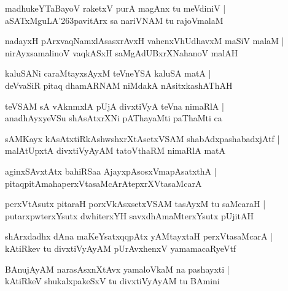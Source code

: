 \documentclass[twoside,12pt,openright]{book}
\def\S{\char'263}
\newcounter{shloka}[chapter]
\begin{document}
\begin{shloka}%
madhukeYTaBayoV raketxV purA magAnx tu meVdiniV |\\
aSATxMguLA\S pavitArx sa nariVNAM tu rajoVmalaM 
\end{shloka}

\begin{shloka}%
nadayxH pArxvaqNamxlAsasxrAvxH vahenxVhUdhavxM maSiV malaM |\\
nirAyxsamalinoV vaqkASxH saMgAdUBxrXNahanoV malAH 
\end{shloka}

\begin{shloka}%
kaluSANi caraMtayxsAyxM teVneYSA kaluSA matA |\\
deVvaSiR pitaq dhamARNAM niMdakA nAsitxkashAThAH 
\end{shloka}

\begin{shloka}%
teVSAM sA vAknmxlA pUjA divxtiVyA teVna nimaRlA |\\
anadhAyxyeVSu shAsAtxrXNi pAThayaMti paThaMti ca 
\end{shloka}

\begin{shloka}%
sAMKayx kAsAtxtiRkAshwshxrXtAsetxVSAM shabAdxpashabadxjAtf |\\
malAtUpxtA divxtiVyAyAM tatoVthaRM nimaRlA matA 
\end{shloka}

\begin{shloka}%
aginxSAvxtAtx bahiRSaa AjayxpAsosxVmapAsatxthA |\\
pitaqpitAmahaperxVtasaMcArAtepxrXVtasaMcarA
\end{shloka}

\begin{shloka}%
perxVtAsutx pitaraH porxVkAsxsetxVSAM tasAyxM tu saMcaraH |\\
putarxpwterxYsutx dwhiterxYH savxdhAmaMterxYsutx pUjitAH 
\end{shloka}

\begin{shloka}%
shArxdadhx dAna maKeYsatxqqpAtx yAMtayxtaH perxVtasaMcarA |\\
kAtiRkev tu divxtiVyAyAM pUrAvxhenxV yamamacaRyeVtf
\end{shloka}

\begin{shloka}%
BAnujAyAM narasAsxnXtAvx yamaloVkaM na pashayxti |\\
kAtiRkeV shukalxpakeSxV tu divxtiVyAyAM tu BAmini 
\end{shloka}
\end{document}
